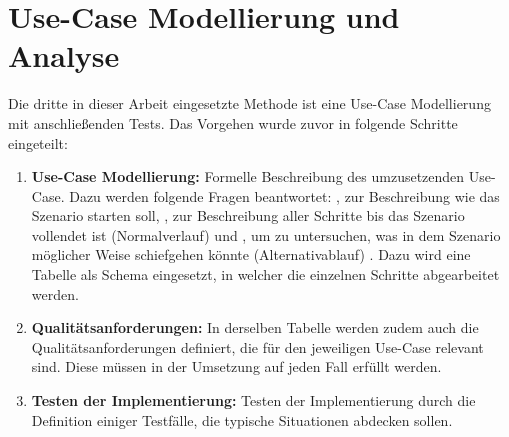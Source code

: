 \section{Use-Case Modellierung und Analyse}

Die dritte in dieser Arbeit eingesetzte Methode ist eine Use-Case Modellierung mit anschließenden Tests. Das Vorgehen wurde zuvor in folgende Schritte eingeteilt:
\begin{enumerate}
    \item \textbf{Use-Case Modellierung:} Formelle Beschreibung des umzusetzenden Use-Case. Dazu werden folgende Fragen beantwortet: \grqq{}, zur Beschreibung wie das Szenario starten soll, \grqq{}, zur Beschreibung aller Schritte bis das Szenario vollendet ist (Normalverlauf) und \grqq{}, um zu untersuchen, was in dem Szenario möglicher Weise schiefgehen könnte (Alternativablauf) \cite[Vgl.][S. 52]{Rosenberg2007}. Dazu wird eine Tabelle als Schema eingesetzt, in welcher die einzelnen Schritte abgearbeitet werden.
    \item \textbf{Qualitätsanforderungen:} In derselben Tabelle werden zudem auch die Qualitätsanforderungen definiert, die für den jeweiligen Use-Case relevant sind. Diese müssen in der Umsetzung auf jeden Fall erfüllt werden.
    \item \textbf{Testen der Implementierung:} Testen der Implementierung durch die Definition einiger Testfälle, die typische Situationen abdecken sollen.
\end{enumerate}